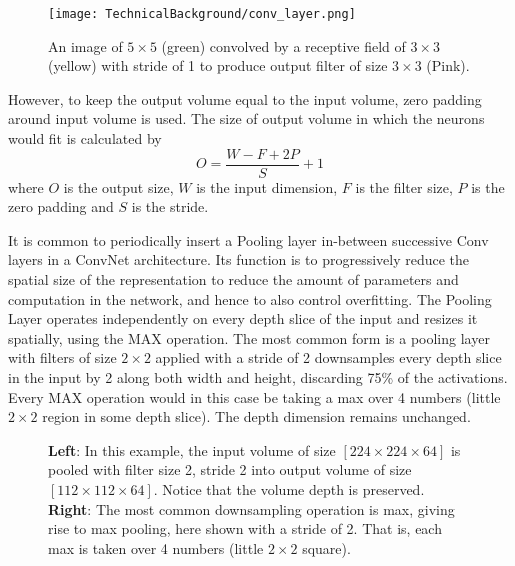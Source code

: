 \begin{description}[leftmargin=0in, labelindent=0pt]
{\begin{figure}[h!]
  \centering
  \texttt{[image: TechnicalBackground/conv\_layer.png]}
  \caption{An image of $5 \times 5$ (green) convolved by a receptive field of $3 \times 3$ (yellow) with stride of 1 to produce output filter of size $3 \times 3$ (Pink). \cite{kandeng2013}}
  \label{fig:conv_layer}
\end{figure}

However, to keep the output volume equal to the input volume, zero padding around input volume is used. The size of output volume in which the neurons would fit is calculated by 
\begin{equation}
O = \frac{W - F + 2P}{S} + 1
\end{equation}
where $O$ is the output size, $W$ is the input dimension, $F$ is the filter size, $P$ is the zero
padding and $S$ is the stride.
} 

\item[Pooling Layer] {It is common to periodically insert a Pooling layer in-between successive Conv layers in a ConvNet architecture. Its function is to progressively reduce the spatial size of the representation to reduce the amount of parameters and computation in the network, and hence to also control overfitting. The Pooling Layer operates independently on every depth slice of the input and resizes it spatially, using the MAX operation. The most common form is a pooling layer with filters of size $2 \times 2$ applied with a stride of 2 downsamples every depth slice in the input by 2 along both width and height, discarding 75\% of the activations. Every MAX operation would in this case be taking a max over 4 numbers (little $2 \times 2$ region in some depth slice). The depth dimension remains unchanged. 

\begin{figure}[h!]
  \centering  
  \caption{\textbf{Left}: In this example, the input volume of size $[224 \times 224 \times 64]$ is pooled with filter size 2, stride 2 into output volume of size $[112 \times 112 \times 64]$. Notice that the volume depth is preserved. \textbf{Right}: The most common downsampling operation is max, giving rise to max pooling, here shown with a stride of 2. That is, each max is taken over 4 numbers (little $2 \times 2$ square). \cite{cnnlecture2017}}
  \label{fig:pooling_layer}
\end{figure}


}
\end{description}
